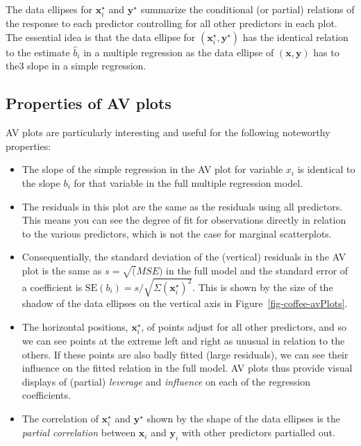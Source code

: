 \documentclass[
  letterpaper,
  10pt,
  krantz2]{krantz}
\begin{document}
The data ellipses for \(\mathbf{x}_i^\star\) and \(\mathbf{y}^\star\)
summarize the conditional (or partial) relations of the response to each
predictor controlling for all other predictors in each plot. The
essential idea is that the data ellipse for
\((\mathbf{x}_i^\star, \mathbf{y}^\star)\) has the identical relation to
the estimate \(\hat{b}_i\) in a multiple regression as the data ellipse
of \((\mathbf{x}, \mathbf{y})\) has to the3 slope in a simple
regression.

\subsection{Properties of AV plots}\label{properties-of-av-plots}

AV plots are particularly interesting and useful for the following
noteworthy properties:

\begin{itemize}
\item
  The slope of the simple regression in the AV plot for variable \(x_i\)
  is identical to the slope \(b_i\) for that variable in the full
  multiple regression model.
\item
  The residuals in this plot are the same as the residuals using all
  predictors. This means you can see the degree of fit for observations
  directly in relation to the various predictors, which is not the case
  for marginal scatterplots.
\item
  Consequentially, the standard deviation of the (vertical) residuals in
  the AV plot is the same as \(s = \sqrt(MSE)\) in the full model and
  the standard error of a coefficient is
  \(\text{SE}(b_i) = s / \sqrt{\Sigma (\mathbf{x}_i^\star)^2}\). This is
  shown by the size of the shadow of the data ellipses on the vertical
  axis in Figure~\ref{fig-coffee-avPlots}.
\item
  The horizontal positions, \(\mathbf{x}_i^\star\), of points adjust for
  all other predictors, and so we can see points at the extreme left and
  right as unusual in relation to the others. If these points are also
  badly fitted (large residuals), we can see their influence on the
  fitted relation in the full model. AV plots thus provide visual
  displays of (partial) \emph{leverage} and \emph{influence} on each of
  the regression coefficients.
\item
  The correlation of \(\mathbf{x}_i^\star\) and \(\mathbf{y}^\star\)
  shown by the shape of the data ellipses is the \emph{partial
  correlation} between \(\mathbf{x}_i\) and \(\mathbf{y}_i\) with other
  predictors partialled out.
\end{itemize}
\end{document}
